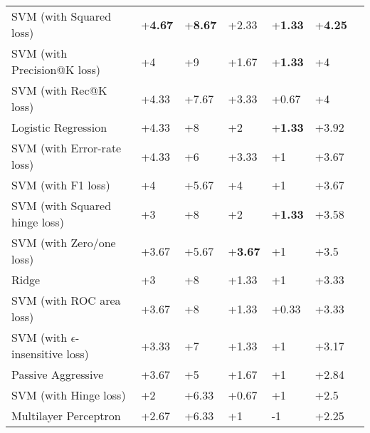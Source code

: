 \begin{table}[h!]
{\begin{tabular}{@{}lllllll@{}}
SVM (with Squared loss)                               & +\textbf{4.67}  & +\textbf{8.67}     & +2.33           & +\textbf{1.33}     & +\textbf{4.25} \\
SVM (with Precision@K loss)                            & +4              & +9                 & +1.67           & +\textbf{1.33}     & +4             \\
SVM (with Rec@K loss)                                 & +4.33           & +7.67              & +3.33           & +0.67              & +4             \\
Logistic Regression                                    & +4.33           & +8                 & +2              & +\textbf{1.33}     & +3.92          \\
SVM (with Error-rate loss)                             & +4.33           & +6                 & +3.33           & +1                 & +3.67          \\
SVM (with F1 loss)                                     & +4              & +5.67              & +4              & +1                 & +3.67          \\
SVM (with Squared hinge loss)                           & +3              & +8                 & +2              & +\textbf{1.33}     & +3.58          \\
SVM (with Zero/one loss)                               & +3.67           & +5.67              & +\textbf{3.67}  & +1                 & +3.5           \\
Ridge                                                   & +3              & +8                 & +1.33           & +1                 & +3.33          \\
SVM (with ROC area loss)                                & +3.67           & +8                 & +1.33           & +0.33              & +3.33          \\
SVM (with $\epsilon$-insensitive loss)                   & +3.33           & +7                 & +1.33           & +1                 & +3.17          \\
Passive Aggressive                                       & +3.67           & +5                 & +1.67           & +1                 & +2.84          \\
SVM (with Hinge loss)                                    & +2              & +6.33              & +0.67           & +1                 & +2.5           \\
Multilayer Perceptron                                 & +2.67           & +6.33              & +1              & -1                & +2.25          \\

\end{tabular}}
\end{table}
